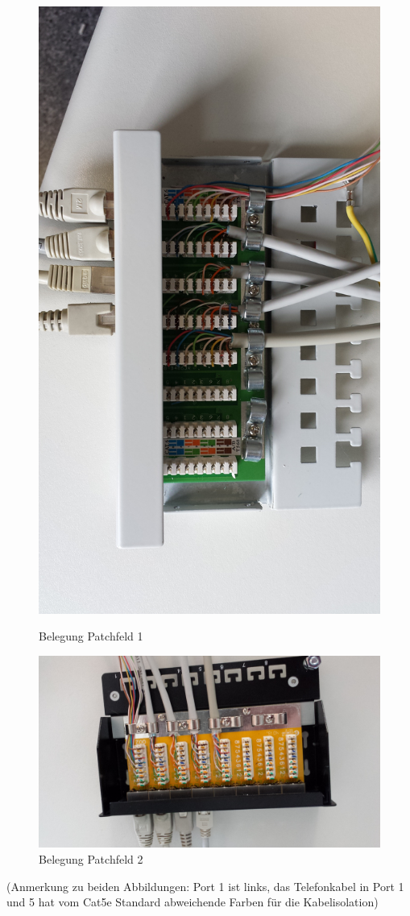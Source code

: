 \documentclass[11pt,a4paper,titlepage]{scrartcl} %
\begin{document}
\begin{figure}[H]
\centering\includegraphics[width=\textwidth]{Bilder/Patchfeld1Belegung}
\caption{Belegung Patchfeld 1}\label{fig:Patch1}
\centering\includegraphics[angle=180,width=\textwidth]{Bilder/Patchfeld2Belegung}
\caption{Belegung Patchfeld 2}\label{fig:Patch2}
\end{figure}
(Anmerkung zu beiden Abbildungen: Port 1 ist links, das Telefonkabel in Port 1 und 5 hat vom Cat5e Standard abweichende Farben für die Kabelisolation)
\end{document}

